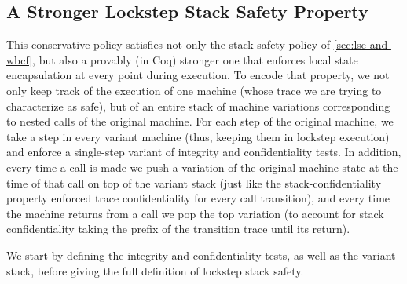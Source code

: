 \documentclass[acmsmall,review,anonymous]{acmart}\settopmatter{printfolios=true,printccs=false,printacmref=false}
\begin{document}
{%


\subsection{A Stronger Lockstep Stack Safety Property}
\label{sec:lockstep}


This conservative policy satisfies not only the stack safety policy of
\cref{sec:lse-and-wbcf},
but also a provably (in Coq) stronger one that enforces local state
encapsulation at every point during execution. To encode that
property, we not only keep track of the execution of one machine
(whose trace we are trying to characterize as safe), but of an entire
stack of machine variations corresponding to nested calls of the
original machine. For each step of the original machine, we take a
step in every variant machine (thus, keeping them in lockstep
execution) and enforce a single-step variant of integrity and
confidentiality tests. In addition, every time a call is made we push
a variation of the original machine state at the time of that call on
top of the variant stack (just like the stack-confidentiality property
enforced trace confidentiality for every call transition), and every time
the machine returns from a call we pop the top variation (to account
for stack confidentiality taking the prefix of the transition trace
until its return).

We start by defining the integrity and confidentiality tests, as well
as the variant stack, before giving the full definition of lockstep
stack safety.

\newcommand{\vse}{\mathit{vse}}
\newcommand{\VSES}{\mathit{VSE}}
\newcommand{\vs}{\mathit{vs}}
\newcommand{\VSS}{\mathit{VS}}

}
\end{document}
